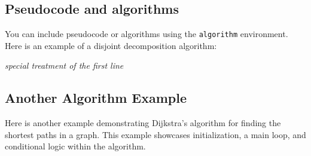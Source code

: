 \subsection{Pseudocode and algorithms}
You can include pseudocode or algorithms using the \texttt{algorithm} environment. Here is an example of a disjoint decomposition algorithm:
\begin{algorithm}
  \BlankLine
  \emph{special treatment of the first line}\;
  \caption{disjoint decomposition}\label{algo_disjdecomp}
\end{algorithm}

\subsection{Another Algorithm Example}
Here is another example demonstrating Dijkstra's algorithm for finding the shortest paths in a graph. This example showcases initialization, a main loop, and conditional logic within the algorithm.

